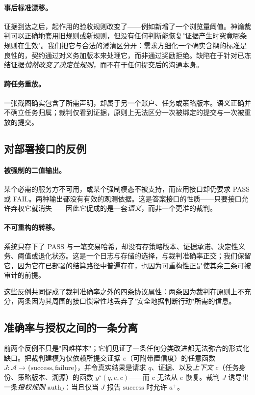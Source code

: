 \documentclass[11pt]{ctexart}
\begin{document}
\paragraph{事后标准漂移。} 证据到达之后，起作用的验收规则改变了——例如新增了一个浏览量阈值。神谕裁判可以正确地套用旧规则或新规则，但没有任何判断能恢复"证据产生时究竟哪条规则在生效"。我们把它与合法的澄清区分开：需求方细化一个确实含糊的标准是良性的，契约通过对义务加版本来处理它，而非通过奖励拒绝。缺陷在于针对已冻结证据\emph{悄然改变了决定性规则}，而不在于任何提交后的沟通本身。

\paragraph{跨任务重放。} 一张截图确实包含了所需声明，却属于另一个账户、任务或策略版本。语义正确并不确立任务归属；裁判仅看到证据，原则上无法区分一次被绑定的提交与一次被重放的提交。

\subsection{对部署接口的反例}
\paragraph{被强制的二值输出。} 某个必需的服务方不可用，或某个强制模态不被支持，而应用接口却仍要求 PASS 或 FAIL。两种输出都没有有效的观测依据。这是答案接口的性质——只要接口允许弃权它就消失——因此它促成的是一套\emph{语义}，而非一个更准的裁判。

\paragraph{不可重构的转移。} 系统只存下了 PASS 与一笔交易哈希，却没有存策略版本、证据承诺、决定性义务、阈值或退化状态。这是一个日志与存储的选择，与裁判准确率正交；我们保留它，因为它在已部署的结算路径中普遍存在，也因为可重构性正是使其余三条可被审计的前提。

这些反例共同促成了裁判准确率之外的四条协议属性：两条因为裁判在原则上不充分，两条因为其周围的接口惯常性地丢弃了"安全地据判断行动"所需的信息。

\subsection{准确率与授权之间的一条分离}
前两个反例不只是"困难样本"；它们见证了一条任何分类改进都无法弥合的形式化缺口。把裁判建模为仅依赖所提交证据 $e$（可附带置信度）的任意函数 $J:\mathcal{A}\to\{\mathrm{success},\mathrm{failure}\}$，并令真实结果是请求 $q$、证据、以及\emph{上下文} $c$（任务身份、策略版本、溯源）的函数 $y^\star(q,e,c)$——而 $c$ 无法从 $e$ 恢复。裁判 $J$ 诱导出一条\emph{授权规则} $\mathrm{auth}_J$：当且仅当 $J$ 报告 $\mathrm{success}$ 时允许 $a^+$。
\end{document}
